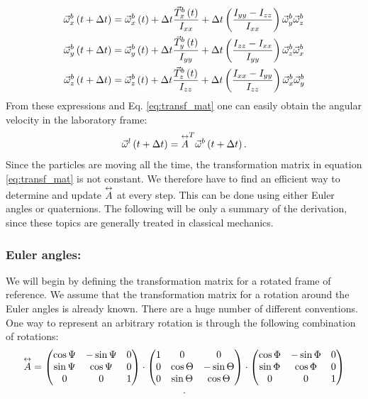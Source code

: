 \begin{align}
\vec{\omega}^b_x \left(t+\Delta t\right)  &= \vec{\omega}^b_x \left(t\right) + 
\Delta t \frac  {\vec{T}^b_x \left(t\right) }{I_{xx}} + \Delta t \left(\frac{{I}_{yy}-{I}_{zz}}{{I}_{xx}}   \right) \vec{\omega}^b_y\vec{\omega}^b_z \\
\vec{\omega}^b_y \left(t+\Delta t\right) &= \vec{\omega}^b_y \left(t\right) + 
\Delta t \frac  {\vec{T}^b_y \left(t\right) }{I_{yy}} + \Delta t \left(\frac{{I}_{zz}-{I}_{xx}}{{I}_{yy}}   \right) \vec{\omega}^b_z\vec{\omega}^b_x \\
\vec{\omega}^b_z \left(t+\Delta t\right) &= \vec{\omega}^b_z \left(t\right) + 
\Delta t \frac  {\vec{T}^b_z \left(t\right) }{I_{zz}} + \Delta t \left(\frac{{I}_{xx}-{I}_{yy}}{{I}_{zz}}   \right) \vec{\omega}^b_x\vec{\omega}^b_y
\end{align}
From these expressions  and Eq. \eqref{eq:transf_mat}  one can easily obtain the angular velocity in the laboratory frame:
$$
\vec{\omega}^l \left(t+\Delta t\right) = \overset{\leftrightarrow}{A}^T \vec{\omega}^b\left(t+\Delta t\right).
$$
Since the particles are moving all the time, the transformation matrix in equation \eqref{eq:transf_mat} is not constant. We therefore have to find an efficient way to determine and update $\overset{\leftrightarrow}{A}$ at every step. This can be done using either Euler angles or quaternions. The following will be only a summary of the derivation, since these topics are generally treated in classical mechanics.



\subsubsection*{Euler angles:}
We will begin by defining the transformation matrix for a rotated frame of reference. We assume that the transformation matrix for a rotation around the Euler angles is already known. There are a huge number of different conventions. One way to represent an arbitrary rotation is through the following combination of rotations:
$$
\overset{\leftrightarrow}{A} = 
\begin{pmatrix}
 \cos{\Psi}  & -\sin{\Psi} & 0 \\
 \sin{\Psi} & \cos{\Psi} &0\\
 0 & 0 & 1   
\end{pmatrix} 
\cdot
\begin{pmatrix}
 1 & 0 & 0 \\
0 & \cos{\Theta} & -\sin{\Theta} \\
 0 & \sin{\Theta} & \cos{\Theta}  
 \end{pmatrix} 
\cdot
\begin{pmatrix}
 \cos{\Phi} & -\sin{\Phi} & 0  \\
 \sin{\Phi} & \cos{\Phi}  & 0  \\
 0 & 0 & 1  
\end{pmatrix} 
$$
\begin{equation}
.
 \label{eq:horr_mat}
\end{equation}

